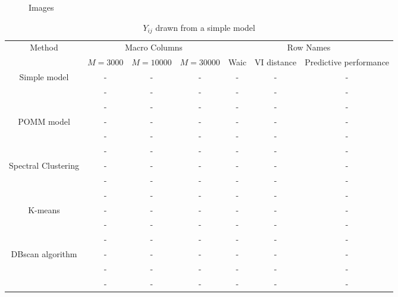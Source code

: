 \documentclass[11pt]{amsart}
\begin{document}
\begin{figure}[htbp]
    \centering
    \hfill
    \hfill
    \caption{Images}
    \label{fig:all_images}
\end{figure}






\begin{table}[htbp]
\centering
\caption{$Y_{ij}$ drawn from a simple model}
\begin{tabular}{ccccccc}
\toprule
\multirow{2}{*}{Method} & \multicolumn{3}{c}{Macro Columns} & \multicolumn{3}{c}{Row Names} \\
\cmidrule{2-4} \cmidrule{5-7}
& $M=3000$ & $M=10000$ & $M=30000$ & Waic & VI distance & Predictive performance \\
\midrule
\multirow{3}{*}{Simple model} & - & - & - & - & - & - \\
& - & - & - & - & - & - \\
& - & - & - & - & - & - \\
\midrule
\multirow{3}{*}{POMM model} & - & - & - & - & - & - \\
& - & - & - & - & - & - \\
& - & - & - & - & - & - \\
\midrule
\multirow{3}{*}{Spectral Clustering} & - & - & - & - & - & - \\
& - & - & - & - & - & - \\
& - & - & - & - & - & - \\
\midrule
\multirow{3}{*}{K-means} & - & - & - & - & - & - \\
& - & - & - & - & - & - \\
& - & - & - & - & - & - \\
\midrule
\multirow{3}{*}{DBscan algorithm} & - & - & - & - & - & - \\
& - & - & - & - & - & - \\
& - & - & - & - & - & - \\
\bottomrule
\end{tabular}
\end{table}
\end{document}
